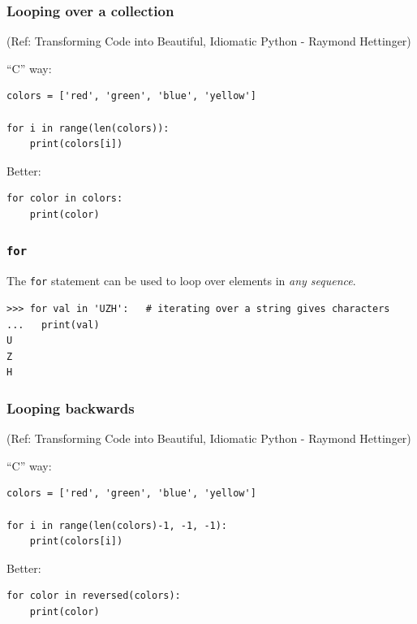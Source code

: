 \begin{frame}[fragile]\frametitle{Looping over a collection}
\tiny{(Ref: Transforming Code into Beautiful, Idiomatic Python -  Raymond Hettinger)}

``C'' way:
\begin{lstlisting}
colors = ['red', 'green', 'blue', 'yellow']

for i in range(len(colors)):
    print(colors[i])
\end{lstlisting}
Better:
\begin{lstlisting}
for color in colors:
    print(color)
\end{lstlisting}
\end{frame}

\begin{frame}[fragile]\frametitle{\texttt{for}}
  The \texttt{for} statement can be used to loop over elements in \emph{any sequence}.

\begin{lstlisting}
>>> for val in 'UZH':   # iterating over a string gives characters
...   print(val)
U
Z
H
\end{lstlisting}

\end{frame}

\begin{frame}[fragile]\frametitle{Looping backwards}
\tiny{(Ref: Transforming Code into Beautiful, Idiomatic Python -  Raymond Hettinger)}

``C'' way:
\begin{lstlisting}
colors = ['red', 'green', 'blue', 'yellow']

for i in range(len(colors)-1, -1, -1):
    print(colors[i])
\end{lstlisting}
Better:
\begin{lstlisting}
for color in reversed(colors):
    print(color)
\end{lstlisting}
\end{frame}






